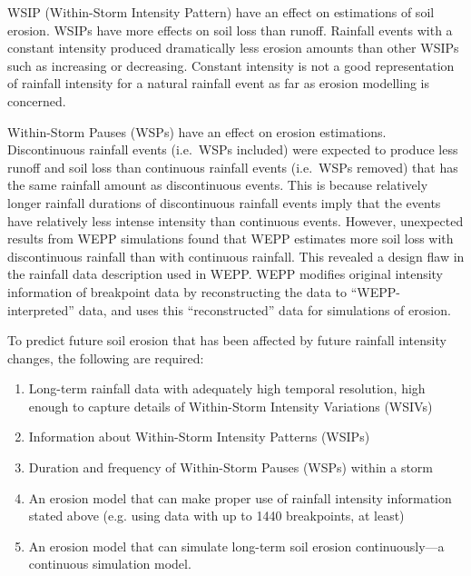WSIP (Within-Storm Intensity Pattern) have an effect on estimations of soil
erosion. WSIPs have more effects on soil loss than runoff. Rainfall events with
a constant intensity produced dramatically less erosion amounts than other WSIPs
such as increasing or decreasing. Constant intensity is not a good
representation of rainfall intensity for a natural rainfall event as far as
erosion modelling is concerned.

Within-Storm Pauses (WSPs) have an effect on erosion estimations. Discontinuous
rainfall events (i.e.\ WSPs included) were expected to produce less runoff and
soil loss than continuous rainfall events (i.e.\ WSPs removed) that has the same
rainfall amount as discontinuous events. This is because relatively longer
rainfall durations of discontinuous rainfall events imply that the events have
relatively less intense intensity than continuous events. However, unexpected
results from WEPP simulations found that WEPP estimates more soil loss with
discontinuous rainfall than with continuous rainfall. This revealed a design
flaw in the rainfall data description used in WEPP. WEPP modifies original
intensity information of breakpoint data by reconstructing the data to
``WEPP-interpreted'' data, and uses this ``reconstructed'' data for simulations
of erosion.

To predict future soil erosion that has been affected by future rainfall
intensity changes, the following are required:
\begin{enumerate}
  \item Long-term rainfall data with adequately high temporal resolution, high
enough to capture details of Within-Storm Intensity Variations (WSIVs)
  \item Information about Within-Storm Intensity Patterns (WSIPs)
  \item Duration and frequency of Within-Storm Pauses (WSPs) within a storm
  \item An erosion model that can make proper use of rainfall intensity
information stated above (e.g. using data with up to 1440 breakpoints, at
least)
  \item An erosion model that can simulate long-term soil erosion
continuously---a continuous simulation model.
\end{enumerate}

